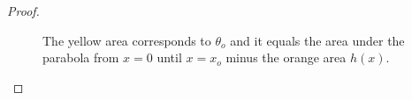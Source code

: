 \begin{proof}
\begin{figure}[h!]\label{fig:parabola-approx-ex}
\center
	\hspace{20pt}%
\caption{The yellow area corresponds to $\theta_o$ and it equals the area under the parabola from $x=0$ until $x=x_o$ minus the orange area $h(x)$.}
\end{figure}


\end{proof}
